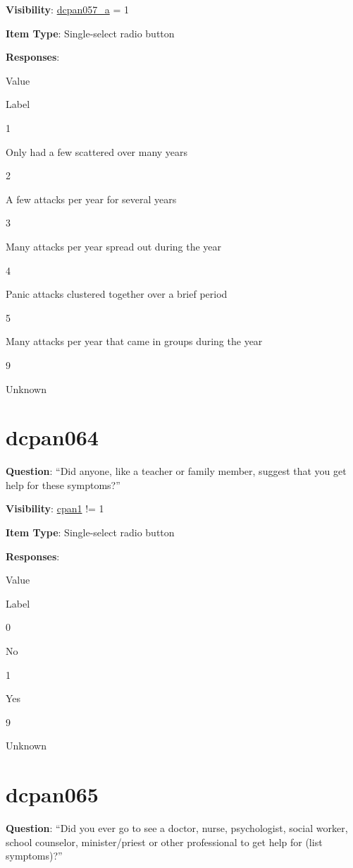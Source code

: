 \documentclass[]{book}
\begin{document}
\textbf{Visibility}: \protect\hyperlink{dcpan057_a}{dcpan057\_a} = 1

\textbf{Item Type}: Single-select radio button

\textbf{Responses}:

Value

Label

1

Only had a few scattered over many years

2

A few attacks per year for several years

3

Many attacks per year spread out during the year

4

Panic attacks clustered together over a brief period

5

Many attacks per year that came in groups during the year

9

Unknown

\hypertarget{dcpan064}{%
\section{dcpan064}\label{dcpan064}}

\textbf{Question}: ``Did anyone, like a teacher or family member, suggest that you get help for these symptoms?''

\textbf{Visibility}: \protect\hyperlink{cpan1}{cpan1} != 1

\textbf{Item Type}: Single-select radio button

\textbf{Responses}:

Value

Label

0

No

1

Yes

9

Unknown

\hypertarget{dcpan065}{%
\section{dcpan065}\label{dcpan065}}

\textbf{Question}: ``Did you ever go to see a doctor, nurse, psychologist, social worker, school counselor, minister/priest or other professional to get help for (list symptoms)?''
\end{document}
